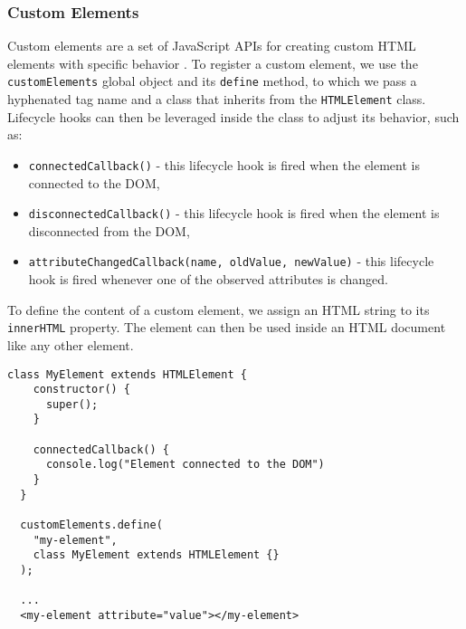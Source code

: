 \subsubsection{Custom Elements}
Custom elements are a set of JavaScript APIs for creating custom HTML elements with specific behavior \cite{MDNWebComponents}. To register a custom element, we use the \texttt{customElements} global object and its \texttt{define} method, to which we pass a hyphenated tag name and a class that inherits from the \texttt{HTMLElement} class. Lifecycle hooks can then be leveraged inside the class to adjust its behavior, such as:
\begin{itemize}
  \item \texttt{connectedCallback()} - this lifecycle hook is fired when the element is connected to the DOM,
  \item \texttt{disconnectedCallback()} - this lifecycle hook is fired when the element is disconnected from the DOM,
  \item \texttt{attributeChangedCallback(name, oldValue, newValue)} - this lifecycle hook is fired whenever one of the observed attributes is changed.
\end{itemize}
To define the content of a custom element, we assign an HTML string to its \texttt{innerHTML} property. The element can then be used inside an HTML document like any other element.
\begin{lstlisting}[caption={Example of creating and using a custom element}]
  class MyElement extends HTMLElement {
    constructor() {
      super();
    }

    connectedCallback() {
      console.log("Element connected to the DOM")
    }
  }

  customElements.define(
    "my-element", 
    class MyElement extends HTMLElement {}
  );

  ...
  <my-element attribute="value"></my-element>
\end{lstlisting}

